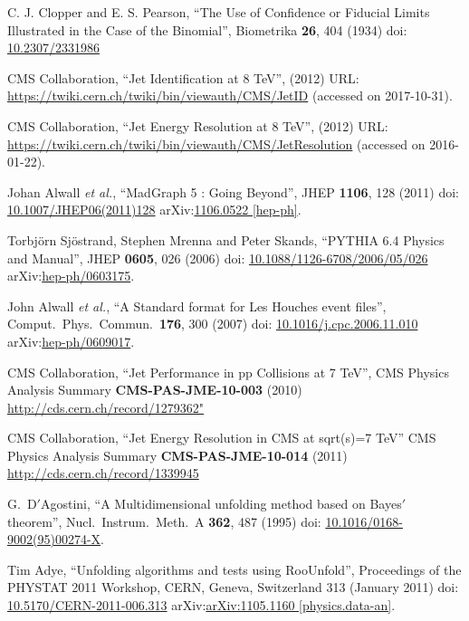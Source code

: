 \begin{thebibliography}{99}

C. J. Clopper and E. S. Pearson, ``The Use of Confidence or Fiducial Limits Illustrated in the Case of the Binomial'', Biometrika {\bf 26}, 404 (1934) doi: \href{http://www.jstor.org/stable/2331986}{10.2307/2331986}

CMS Collaboration, ``Jet Identification at 8 TeV'', (2012) URL: \url{https://twiki.cern.ch/twiki/bin/viewauth/CMS/JetID} (accessed on 2017-10-31).

CMS Collaboration, ``Jet Energy Resolution at 8 TeV'', (2012) URL: \url{https://twiki.cern.ch/twiki/bin/viewauth/CMS/JetResolution} (accessed on 2016-01-22).

 Johan Alwall {\it et al.}, ``MadGraph 5 : Going Beyond'', JHEP {\bf 1106}, 128 (2011) doi: \href{https://doi.org/10.1007/JHEP06(2011)128}{10.1007/JHEP06(2011)128} arXiv:\href{https://arxiv.org/abs/1106.0522}{1106.0522 [hep-ph]}.

Torbj\"{o}rn Sj\"{o}strand, Stephen Mrenna and Peter Skands, ``PYTHIA 6.4 Physics and Manual'', JHEP {\bf 0605}, 026 (2006) doi: \href{http://dx.doi.org/10.1088/1126-6708/2006/05/026}{10.1088/1126-6708/2006/05/026} arXiv:\href{https://arxiv.org/abs/hep-ph/0603175}{hep-ph/0603175}.
 
John Alwall {\it et al.}, ``A Standard format for Les Houches event files'', Comput.\ Phys.\ Commun.\  {\bf 176}, 300 (2007) doi: \href{http://dx.doi.org/10.1016/j.cpc.2006.11.010}{10.1016/j.cpc.2006.11.010} arXiv:\href{https://arxiv.org/abs/hep-ph/0609017}{hep-ph/0609017}.
  
CMS Collaboration, ``Jet Performance in pp Collisions at 7 TeV'', CMS Physics Analysis Summary {\bf CMS-PAS-JME-10-003} (2010) \url{http://cds.cern.ch/record/1279362"}

CMS Collaboration, ``Jet Energy Resolution in CMS at sqrt(s)=7 TeV'' CMS Physics Analysis Summary {\bf CMS-PAS-JME-10-014} (2011) \url {http://cds.cern.ch/record/1339945}

G.~D$'$Agostini, ``A Multidimensional unfolding method based on Bayes$'$ theorem'', Nucl.\ Instrum.\ Meth.\ A {\bf 362}, 487 (1995) doi: \href{http://dx.doi.org/10.1016/0168-9002(95)00274-X}{10.1016/0168-9002(95)00274-X}.

Tim Adye, ``Unfolding algorithms and tests using RooUnfold'', Proceedings of the PHYSTAT 2011 Workshop, CERN, Geneva, Switzerland 313 (January 2011) doi: \href{http://dx.doi.org/10.5170/CERN-2011-006.313}{10.5170/CERN-2011-006.313} arXiv:\href{https://arxiv.org/abs/1105.1160}{arXiv:1105.1160 [physics.data-an]}.


\end{thebibliography}

